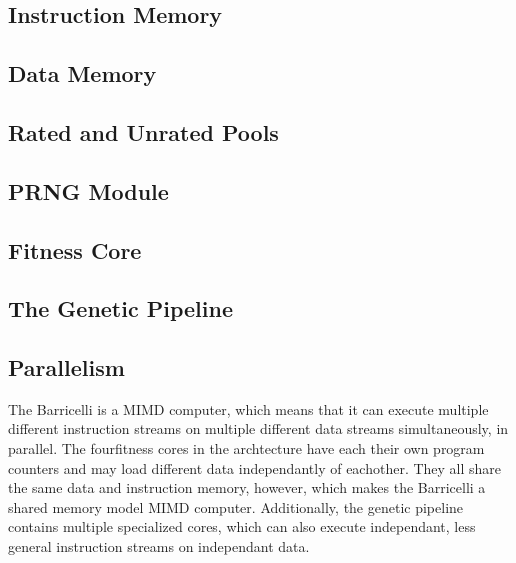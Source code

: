 \subsection{Instruction Memory}
\label{subsec:fpga-instruction-memory}


\subsection{Data Memory}
\label{subsec:fpga-data-memory}


\subsection{Rated and Unrated Pools}


\subsection{PRNG Module}
    
 

\subsection{Fitness Core} \label{fpga:fitness:ss:design_of_the_fitness_core}
     \label{fpga:subsection:fitness_core}


\subsection{The Genetic Pipeline}
\label{fpga:subsection:genetic_pipeline}


\subsection{Parallelism}
The Barricelli is a MIMD computer, which means that it can execute multiple different instruction streams on multiple different data streams simultaneously, in parallel.
The four\cn fitness cores in the archtecture have each their own program counters and may load different data independantly of eachother.
They all share the same data and instruction memory, however, which makes the Barricelli a shared memory model MIMD computer.
Additionally, the genetic pipeline contains multiple specialized cores, which can also execute independant, less general instruction streams on independant data.

